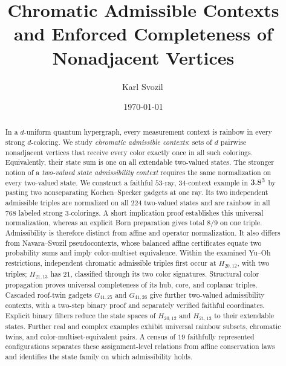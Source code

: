 \documentclass[aps,pra,reprint,superscriptaddress,longbibliography,nofootinbib,floatfix,10pt]{revtex4-2}
\theoremstyle{definition}\newtheorem{definition}[theorem]{Definition}
\theoremstyle{remark}\newtheorem{remark}[theorem]{Remark}
\begin{document}
\title{Chromatic Admissible Contexts and Enforced Completeness of Nonadjacent Vertices}

\author{Karl Svozil\,}

\date{\today}

\begin{abstract}
In a $d$-uniform quantum hypergraph, every measurement context is rainbow in every strong $d$-coloring. We study \emph{chromatic admissible contexts}: sets of $d$ pairwise nonadjacent vertices that receive every color exactly once in all such colorings. Equivalently, their state sum is one on all extendable two-valued states. The stronger notion of a \emph{two-valued state admissibility context} requires the same normalization on every two-valued state. We construct a faithful $53$-ray, $34$-context example in $3.8^3$ by pasting two nonseparating Kochen--Specker gadgets at one ray. Its two independent admissible triples are normalized on all $224$ two-valued states and are rainbow in all $768$ labeled strong $3$-colorings. A short implication proof establishes this universal normalization, whereas an explicit Born preparation gives total $8/9$ on one triple. Admissibility is therefore distinct from affine and operator normalization. It also differs from Navara--Svozil pseudocontexts, whose balanced affine certificates equate two probability sums and imply color-multiset equivalence. Within the examined Yu--Oh restrictions, independent chromatic admissible triples first occur at $H_{20,12}$, with two triples; $H_{21,13}$ has $21$, classified through its two color signatures. Structural color propagation proves universal completeness of its hub, core, and coplanar triples. Cascaded roof-twin gadgets $G_{41,25}$ and $G_{41,26}$ give further two-valued admissibility contexts, with a two-step binary proof and separately verified faithful coordinates. Explicit binary filters reduce the state spaces of $H_{20,12}$ and $H_{21,13}$ to their extendable states. Further real and complex examples exhibit universal rainbow subsets, chromatic twins, and color-multiset-equivalent pairs. A census of $19$ faithfully represented configurations separates these assignment-level relations from affine conservation laws and identifies the state family on which admissibility holds.
\end{abstract}

\maketitle
\end{document}
